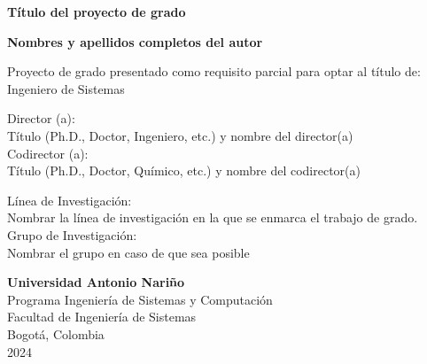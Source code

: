 \begin{titlepage}
    \begin{center}
        \vspace*{1cm}

        \Huge
        \textbf{Título del proyecto de grado}
 
        \vfill
        
        \large
        \textbf{Nombres y apellidos completos del autor}\\
 
        \vfill

        Proyecto de grado presentado como requisito parcial para optar al título de:\\
        Ingeniero de Sistemas\\

        \vfill

        Director (a):\\
        Título (Ph.D., Doctor, Ingeniero, etc.) y nombre del director(a)\\
        Codirector (a):\\
        Título (Ph.D., Doctor, Químico, etc.) y nombre del codirector(a)\\

        \vfill

        Línea de Investigación:\\
        Nombrar la línea de investigación en la que se enmarca el trabajo de grado.\\
        Grupo de Investigación:\\
        Nombrar el grupo en caso de que sea posible\\

             
        \vspace{0.8cm}
             
        \textbf{Universidad Antonio Nariño}\\
        Programa Ingeniería de Sistemas y Computación\\
        Facultad de Ingeniería de Sistemas\\
        Bogotá, Colombia\\
        2024
    \end{center}
\end{titlepage}
